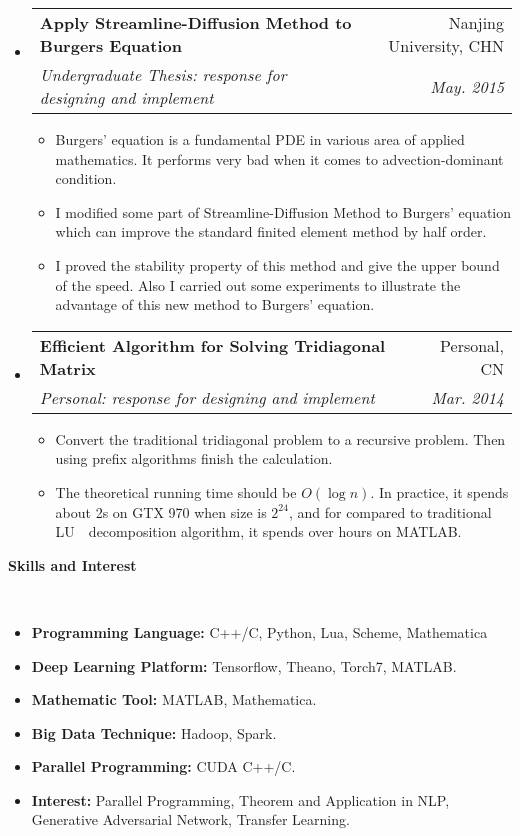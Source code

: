 \documentclass[a4paper,11pt]{article}
\makeatletter
\newcommand{\resitem}[1]{\item #1 \vspace{-2pt}}
\renewcommand{\normalsize}{\fontsize{12pt}{\baselineskip}\selectfont}
\newcommand{\resheading}[1]{{\large \colorbox{mygrey}{\begin{minipage}{\textwidth}{\textbf{#1 \vphantom{p\^{E}}}}\end{minipage}}}}
\newcommand{\ressubheading}[4]{
	\begin{tabular*}{6.5in}{l@{\extracolsep{\fill}}r}
		\textbf{#1} & #2 \\
		\textit{#3} & \textit{#4} \\
	\end{tabular*}\vspace{-6pt}}
\makeatother
\begin{document}
\begin{itemize}
				\item \ressubheading{\normalsize Apply Streamline-Diffusion Method to Burgers Equation}{Nanjing University, CHN}{\normalsize Undergraduate Thesis: response for designing and implement}{May. 2015}
				\begin{itemize}
					\resitem{Burgers' equation is a fundamental PDE in various area of applied mathematics. It performs very bad when it comes to advection-dominant condition.}
					\resitem{I modified some part of Streamline-Diffusion Method to Burgers' equation which can improve the standard finited element method by half order.}
					\resitem{I proved the stability property of this method and give the upper bound of the speed. Also I carried out some experiments to illustrate the advantage of this new method to Burgers' equation.}
				\end{itemize}
				\item \ressubheading{\normalsize Efficient Algorithm for Solving Tridiagonal Matrix}{Personal, CN}{\normalsize Personal: response for designing and implement}{Mar. 2014}
				\begin{itemize}
					\resitem{Convert the traditional tridiagonal problem to a recursive problem. Then using prefix algorithms finish the calculation.}
					\resitem{The theoretical running time should be $ O(\log n) $. In practice, it spends about 2s on GTX 970 when size is $ 2^{24} $, and for compared to traditional LU　decomposition algorithm, it spends over hours on MATLAB.} 
				\end{itemize}
		\end{itemize}
		
		\resheading{Skills and Interest}\\
		\begin{itemize}
			\item \textbf{Programming Language:} C++/C, Python, Lua, Scheme, Mathematica
			\item \textbf{Deep Learning Platform:} Tensorflow, Theano, Torch7, MATLAB.
			\item \textbf{Mathematic Tool:} MATLAB, Mathematica.
			\item \textbf{Big Data Technique:} Hadoop, Spark.
			\item \textbf{Parallel Programming:} CUDA C++/C.
			\item \textbf{Interest:} Parallel Programming, Theorem and Application in NLP, Generative Adversarial Network, Transfer Learning.
		\end{itemize}
		
\end{document}
